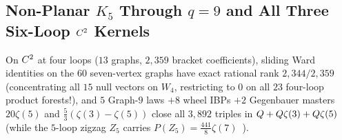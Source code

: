 \subsection{Non-Planar \texorpdfstring{$K_5$}{K\_5} Through \texorpdfstring{$q=9$}{q=9} and All Three Six-Loop \texorpdfstring{$C^2$}{C\^2} Kernels}
\label{subsec:k5-periods-sixloop}

On $C^2$ at four loops ($13$ graphs, $2{,}359$ bracket coefficients), sliding Ward identities on the $60$ seven-vertex graphs have exact rational rank $2{,}344/2{,}359$ (concentrating all $15$ null vectors on $W_4$, restricting to $0$ on all $23$ four-loop product forests!), and $5$ Graph-$9$ laws $+ 8$ wheel IBPs $+ 2$ Gegenbauer masters $20\zeta(5)$ and $\frac{5}{3}(\zeta(3)-\zeta(5))$ close all $3{,}892$ triples in $Q+Q\zeta(3)+Q\zeta(5)$ (while the $5$-loop zigzag $Z_5$ carries $P(Z_5) = \frac{441}{8}\zeta(7)$~\cite{Schnetz10}).

